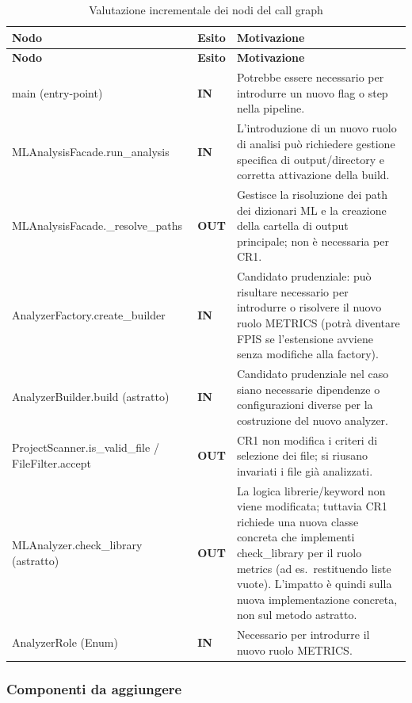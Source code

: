 \documentclass[11pt,a4paper]{article}
\makeatletter
\newif\ifmark@prevlower
\def\mark@casebreak#1{%
  \ifcat\noexpand#1\relax
    \mark@prevlowerfalse
  \else
    \ifnum`#1=\uccode`#1\relax
      \ifmark@prevlower\allowbreak\fi
      \mark@prevlowerfalse
    \else
      \ifnum`#1=\lccode`#1\relax
        \mark@prevlowertrue
      \else
        \mark@prevlowerfalse
      \fi
    \fi
  \fi}
\def\mark@brk#1{%
  \ifx#1\mark@stop
    \let\mark@next\relax
  \else
    \mark@casebreak{#1}%
    #1%
    \ifx#1.\allowbreak\else
      \ifx#1\_\allowbreak\else
        \ifx#1/\allowbreak\else
          \ifx#1(\allowbreak\fi
        \fi
      \fi
    \fi
    \let\mark@next\mark@brk
  \fi
  \mark@next}
\def\mark@stop{\mark@stop}
\DeclareRobustCommand{\mark@code}[1]{%
  \ifmmode
    \text{\ttfamily\small\mark@prevlowerfalse\mark@brk#1\mark@stop}%
  \else
    {\ttfamily\small\mark@prevlowerfalse\mark@brk#1\mark@stop}%
  \fi}
\DeclareRobustCommand{\code}[1]{\mark@code{#1}}
\DeclareRobustCommand{\cls}[1]{\mark@code{#1}}
\DeclareRobustCommand{\meth}[1]{\mark@code{#1}}
\def\mark@code#1{#1}%
\def\code#1{#1}%
\def\cls#1{#1}%
\def\meth#1{#1}%
\newcommand{\In}{\textbf{IN}}
\newcommand{\Out}{\textbf{OUT}}
\newcommand{\thead}[1]{\textbf{#1}}
\makeatother
\begin{document}
\begin{longtable}{@{}L{6.0cm} C{1.3cm} L{7.4cm}@{}}
  \caption{Valutazione incrementale dei nodi del call graph}
  \label{tab:ia-valutazione}\\
  \toprule
  \thead{Nodo} & \thead{Esito} & \thead{Motivazione}\\
  \midrule
  \endfirsthead
  \toprule
  \thead{Nodo} & \thead{Esito} & \thead{Motivazione}\\
  \midrule
  \endhead
  \bottomrule
  \endfoot
  \meth{main} (entry-point) & \In &
    Potrebbe essere necessario per introdurre un nuovo flag o step nella
    pipeline.\\
  \meth{MLAnalysisFacade.run\_analysis} & \In &
    L'introduzione di un nuovo ruolo di analisi pu\`o richiedere gestione
    specifica di output/directory e corretta attivazione della build.\\
  \meth{MLAnalysisFacade.\_resolve\_paths} & \Out &
    Gestisce la risoluzione dei path dei dizionari ML e la creazione della
    cartella di output principale; non \`e necessaria per CR1.\\
  \meth{AnalyzerFactory.create\_builder} & \In &
    Candidato prudenziale: pu\`o risultare necessario per introdurre o
    risolvere il nuovo ruolo \code{METRICS} (potr\`a diventare FPIS se
    l'estensione avviene senza modifiche alla factory).\\
  \meth{AnalyzerBuilder.build} (astratto) & \In &
    Candidato prudenziale nel caso siano necessarie dipendenze o
    configurazioni diverse per la costruzione del nuovo analyzer.\\
  \meth{ProjectScanner.is\_valid\_file} / \meth{FileFilter.accept} & \Out &
    CR1 non modifica i criteri di selezione dei file; si riusano invariati i
    file gi\`a analizzati.\\
  \meth{MLAnalyzer.check\_library} (astratto) & \Out &
    La logica librerie/keyword non viene modificata; tuttavia CR1 richiede una
    nuova classe concreta che implementi \meth{check\_library} per il ruolo
    metrics (ad es.\ restituendo liste vuote). L'impatto \`e quindi sulla nuova
    implementazione concreta, non sul metodo astratto.\\
  \cls{AnalyzerRole} (Enum) & \In &
    Necessario per introdurre il nuovo ruolo \code{METRICS}.\\
\end{longtable}

\subsubsection*{Componenti da aggiungere}
\end{document}
